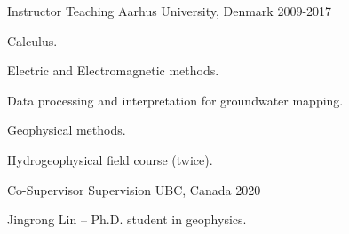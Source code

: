 

\begin{cventries}

  \cventry
    {Instructor} %
    {Teaching} %
    {Aarhus University, Denmark} %
    {2009-2017} %
    {
      \begin{cvitems} %
        \item {Calculus.}
        \item {Electric and Electromagnetic methods.}
        \item {Data processing and interpretation for groundwater mapping.}
        \item {Geophysical methods.}
        \item {Hydrogeophysical field course (twice).}
      \end{cvitems}
    }

  \cventry
    {Co-Supervisor} %
    {Supervision} %
    {UBC, Canada} %
    {2020} %
    {
      \begin{cvitems} %
        \item {Jingrong Lin -- Ph.D. student in geophysics.}
      \end{cvitems}
    }


\end{cventries}
